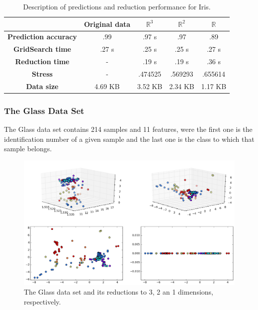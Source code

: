 \documentclass[12pt]{article}
\begin{document}
\begin{table}[H]
	\centering
	\begin{tabular}{|c|c|c|c|c|}
		\hline
		& \textbf{Original data} & \textbf{$\mathbb{R}^3$} & \textbf{$\mathbb{R}^2$} & \textbf{$\mathbb{R}$} \\\hline
		\textbf{Prediction accuracy}   & .99       & .97  s     & .97      & .89    \\\hline
		\textbf{GridSearch time}           & .27 s & .25 s   & .25 s        & .27 s \\\hline
		\textbf{Reduction time}             & -            & .19 s   & .19 s & .36 s   \\\hline
		\textbf{Stress}                                & - & .474525         & .569293   & .655614 \\\hline 
		\textbf{Data size}                       & 4.69 KB & 3.52 KB  & 2.34 KB  & 1.17 KB \\\hline
	\end{tabular}
	
	\caption{Description of predictions and reduction performance for Iris.}
\end{table}

\newpage
\subsubsection{The Glass Data Set}

The Glass data set contains 214 samples and 11 features, were the first one is the identification number of a given sample and the last one is the class to which that sample belongs.

\begin{figure}[H]
	\centering
	\includegraphics[width=\linewidth]{experiments/2_4_glass_isomap}
	\captionsetup{justification=centering}
	\caption{The Glass data set and its reductions to 3, 2 an 1 dimensions, respectively.}
\end{figure}
\end{document}
